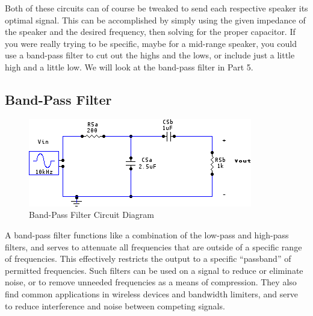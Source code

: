\documentclass[twocolumn,english]{IEEEtran}
\theoremstyle{plain}
\theoremstyle{plain}
\begin{document}
	Both of these circuits can of course be tweaked to send each respective speaker its optimal signal.
	This can be accomplished by simply using the given impedance of the speaker and the desired frequency, then solving for the proper capacitor.
	If you were really trying to be specific, maybe for a mid-range speaker, you could use a band-pass filter to cut out the highs and the lows, or include just a little high and a little low. We will look at the band-pass filter in Part 5.

	\subsection{Band-Pass Filter}
	\begin{figure}[H]
			\begin{centering}
			\begin{center}
			\includegraphics[width=\linewidth]{./Circuits/BandPassFilter.png}
			\caption{Band-Pass Filter Circuit Diagram}
			\label{diag:bandpass}
			\end{center}
			\par\end{centering}
	\end{figure}
	A band-pass filter functions like a combination of the low-pass and high-pass filters, and serves to attenuate all frequencies that are outside of a specific range of frequencies. This effectively restricts the output to a specific ``passband'' of permitted frequencies. Such filters can be used on a signal to reduce or eliminate noise, or to remove unneeded frequencies as a means of compression. They also find common applications in wireless devices and bandwidth limiters, and serve to reduce interference and noise between competing signals.

\hrulefill
\end{document}
